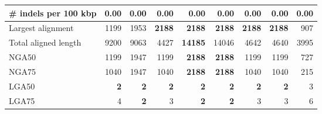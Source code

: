\documentclass[12pt,a4paper]{article}
\begin{document}
\begin{table}[ht]
\begin{center}
\begin{tabular}{|l*{8}{|r}|}
\# indels per 100 kbp & 0.00 & 0.00 & 0.00 & 0.00 & 0.00 & 0.00 & 0.00 & 0.00 \\ \hline
Largest alignment & 1199 & 1953 & {\bf 2188} & {\bf 2188} & {\bf 2188} & {\bf 2188} & {\bf 2188} & 907 \\ \hline
Total aligned length & 9200 & 9063 & 4427 & {\bf 14185} & 14046 & 4642 & 4640 & 3995 \\ \hline
NGA50 & 1199 & 1947 & 1199 & {\bf 2188} & {\bf 2188} & 1199 & 1199 & 727 \\ \hline
NGA75 & 1040 & 1947 & 1040 & {\bf 2188} & {\bf 2188} & 1040 & 1040 & 215 \\ \hline
LGA50 & {\bf 2} & {\bf 2} & {\bf 2} & {\bf 2} & {\bf 2} & {\bf 2} & {\bf 2} & 3 \\ \hline
LGA75 & 4 & {\bf 2} & 3 & {\bf 2} & {\bf 2} & 3 & 3 & 6 \\ \hline
\end{tabular}
\end{center}
\end{table}
\end{document}
